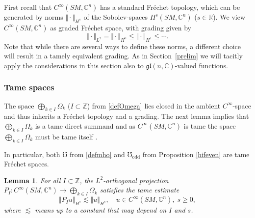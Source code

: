 \documentclass[JEP,XML,SOM,Unicode,published]{cedram}
\theoremstyle{plain}
\newtheorem{lemma}[theorem]{Lemma}
\theoremstyle{definition}
\newcommand{\Z}{\mathbb{Z}}
\newcommand{\R}{\mathbb{R}}
\newcommand{\C}{\mathbb{C}}
\newcommand{\gl}{\mathfrak{gl}}
\newcommand{\1}{{\bf 1}}
\begin{document}
First recall that $C^\infty(SM,\C^n)$ has a standard Fréchet topology, which can be generated by norms $\Vert \cdot \Vert_{H^s}$ of the Sobolev-spaces $H^s(SM,\C^n)$ ($s\in \R$). We view $C^\infty(SM,\C^n)$ as graded Fréchet space, with grading given by\vspace*{-3pt}
\begin{equation}\label{sobolevgrading}
\Vert \cdot \Vert_{L^2} = \Vert \cdot \Vert_{H^0} \le \Vert \cdot \Vert_{H^1} \le \cdots.
\end{equation}
Note that while there are several ways to define these norms, a different choice will result in a tamely equivalent grading. As in Section~\ref{prelim} we will tacitly apply the considerations in this section also to $\gl(n,\C)$-valued functions.

\subsubsection{Tame spaces} The space $\bigoplus_{k\in I}\Omega_k$ ($I\subset \Z$) from \eqref{defOmega} lies closed in the ambient $C^\infty$-space and thus inherits a Fréchet topology and a grading. The next lemma implies that $\bigoplus_{k\in I}\Omega_k$ is a tame direct summand and as $C^\infty(SM,\C^n)$ is tame \cite[Cor.\,1.3.7, \S II]{Ham82} the space $\bigoplus_{k\in I} \Omega_k$ must be tame itself \cite[Lem.\,1.3.3, \S II]{Ham82}.

In particular, both $\mho$ from \eqref{defmho} and $\mho_{\text{odd}}$ from Proposition \ref{hifeven} are tame Fréchet spaces.

\begin{lemma}\label{tameproj} For all $I\subset \Z$, the $L^2$-orthogonal projection
$P_I:C^\infty(SM,\C^n)\to \bigoplus_{k\in I} \Omega_k$ satisfies the tame estimate
\begin{equation*}
\Vert P_I u \Vert_{H^s} \lesssim \Vert u \Vert_{H^s},\quad u\in C^\infty(SM,\C^n),\; s\ge 0,
\end{equation*}
where $\lesssim$ means up to a constant that may depend on $I$ and $s$.
\end{lemma}
\end{document}
